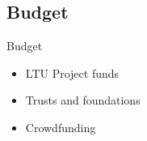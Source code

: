\documentclass[11pt, aspectratio=169]{beamer}
\begin{document}

\subsection{Budget} 			%
\begin{frame}{Budget}
\begin{itemize}
	\item LTU Project funds
	\item Trusts and foundations
	\item Crowdfunding
\end{itemize}
\end{frame}
\end{document}
